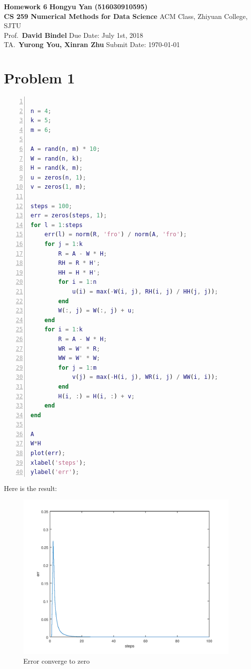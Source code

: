 \documentclass[a4paper, 11pt]{article}
\begin{document}
\noindent
\large\textbf{Homework 6} \hfill \textbf{Hongyu Yan (516030910595)} \\
\normalsize {\bf CS 259 Numerical Methods for Data Science} \hfill ACM Class, Zhiyuan College, SJTU\\
Prof.~{\bf David Bindel} \hfill Due Date: July 1st, 2018\\
TA.~{\bf Yurong You, Xinran Zhu} \hfill Submit Date: \today

\section*{Problem 1}

\begin{lstlisting}[language = Matlab, numbers=left,   
  numberstyle=\tiny,keywordstyle=\color{blue!70},  
  commentstyle=\color{red!50!green!50!blue!50},frame=shadowbox,  
  rulesepcolor=\color{red!20!green!20!blue!20},basicstyle=\ttfamily,
  tabsize=2]
% code for problem 1 (HALS-RRI)

n = 4;
k = 5;
m = 6;

A = rand(n, m) * 10;
W = rand(n, k);
H = rand(k, m);
u = zeros(n, 1);
v = zeros(1, m);

steps = 100;
err = zeros(steps, 1);
for l = 1:steps
	err(l) = norm(R, 'fro') / norm(A, 'fro');
	for j = 1:k
		R = A - W * H;
		RH = R * H';
		HH = H * H';
		for i = 1:n
			u(i) = max(-W(i, j), RH(i, j) / HH(j, j));
		end
		W(:, j) = W(:, j) + u;
	end
	for i = 1:k
		R = A - W * H;
		WR = W' * R;
		WW = W' * W;
		for j = 1:m
			v(j) = max(-H(i, j), WR(i, j) / WW(i, i));
		end
		H(i, :) = H(i, :) + v;
	end
end

A
W*H
plot(err);
xlabel('steps');
ylabel('err');
\end{lstlisting}


Here is the result:
\begin{figure}[htbp]
\centering
	\includegraphics[scale=0.6]{figure/p1_done.png}
	\caption{Error converge to zero}
	\label{fig1}
\end{figure}
\end{document}
